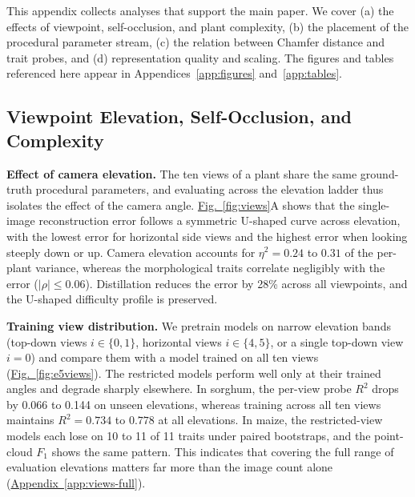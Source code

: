 \documentclass[10pt,twocolumn,letterpaper]{article}
\newcommand{\figref}[1]{\hyperref[#1]{Fig.~\ref*{#1}}}
\newcommand{\appendixref}[1]{\hyperref[#1]{Appendix~\ref*{#1}}}
\begin{document}
This appendix collects analyses that support the main paper. We cover (a) the effects of viewpoint, self-occlusion, and plant complexity, (b) the placement of the procedural parameter stream, (c) the relation between Chamfer distance and trait probes, and (d) representation quality and scaling. The figures and tables referenced here appear in \textcolor{cvprblue}{Appendices}~\ref{app:figures} and~\ref{app:tables}.

\subsection{Viewpoint Elevation, Self-Occlusion, and Complexity}
\label{sec:regime2}\label{sec:exp-regime2}

\noindent\textbf{Effect of camera elevation.}
The ten views of a plant share the same ground-truth procedural parameters, and evaluating across the elevation ladder thus isolates the effect of the camera angle. \figref{fig:views}A shows that the single-image reconstruction error follows a symmetric U-shaped curve across elevation, with the lowest error for horizontal side views and the highest error when looking steeply down or up. Camera elevation accounts for $\eta^2 = 0.24$ to $0.31$ of the per-plant variance, whereas the morphological traits correlate negligibly with the error ($|\rho| \le 0.06$). Distillation reduces the error by 28\% across all viewpoints, and the U-shaped difficulty profile is preserved.

\noindent\textbf{Training view distribution.}
We pretrain models on narrow elevation bands (top-down views $i \in \{0,1\}$, horizontal views $i \in \{4,5\}$, or a single top-down view $i=0$) and compare them with a model trained on all ten views (\figref{fig:e5views}). The restricted models perform well only at their trained angles and degrade sharply elsewhere. In sorghum, the per-view probe $R^2$ drops by 0.066 to 0.144 on unseen elevations, whereas training across all ten views maintains $R^2 = 0.734$ to $0.778$ at all elevations. In maize, the restricted-view models each lose on 10 to 11 of 11 traits under paired bootstraps, and the point-cloud $F_1$ shows the same pattern. This indicates that covering the full range of evaluation elevations matters far more than the image count alone (\appendixref{app:views-full}).
\end{document}
